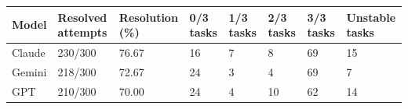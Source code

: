 \begin{tabular}{llllllll}
\hline
Model & Resolved attempts & Resolution (\%) & 0/3 tasks & 1/3 tasks & 2/3 tasks & 3/3 tasks & Unstable tasks \\
\hline
Claude & 230/300 & 76.67 & 16 & 7 & 8 & 69 & 15 \\
Gemini & 218/300 & 72.67 & 24 & 3 & 4 & 69 & 7 \\
GPT & 210/300 & 70.00 & 24 & 4 & 10 & 62 & 14 \\
\hline
\end{tabular}
